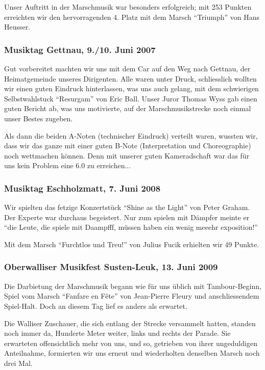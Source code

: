 \begin{history}
    Unser Auftritt in der Marschmusik war besonders erfolgreich; mit 253 Punkten
    erreichten wir den hervorragenden 4. Platz mit dem Marsch \enquote{Triumph}
    von Hans Heusser.


    \subsubsection*{Musiktag Gettnau, 9./10. Juni 2007}

    Gut vorbereitet machten wir uns mit dem Car auf den Weg nach Gettnau, der
    Heimatgemeinde unseres Dirigenten. Alle waren unter Druck, schliesslich
    wollten wir einen guten Eindruck hinterlassen, was uns auch gelang, mit dem
    schwierigen Selbstwahlstuck \enquote{Resurgam} von Eric Ball. Unser Juror
    Thomas Wyss gab einen guten Bericht ab, was uns motivierte, auf der
    Marschmusikstrecke noch einmal unser Bestes zugeben.

    Als dann die beiden A-Noten (technischer Eindruck) verteilt waren, wussten
    wir, dass wir das ganze mit einer guten B-Note (Interpretation und
    Choreographie) noch wettmachen können. Denn mit unserer guten Kameradschaft
    war das für uns kein Problem eine 6.0 zu erreichen...


    \subsubsection*{Musiktag Eschholzmatt, 7. Juni 2008}

    Wir spielten das fetzige Konzertstück \enquote{Shine as the Light} von Peter
    Graham. Der Experte war durchaus begeistert. Nur zum spielen mit Dämpfer
    meinte er \enquote{die Leute, die spiele mit Daampfff, müssen haben ein
        wenig meeehr exposition!}

    Mit dem Marsch \enquote{Furchtlos und Treu!} von Julius Fucik erhielten wir
    49 Punkte.


    \subsubsection*{Oberwalliser Musikfest Susten-Leuk, 13. Juni 2009}

    Die Darbietung der Marschmusik begann wie für uns üblich mit Tambour-Beginn,
    Spiel vom Marsch \enquote{Fanfare en Fête} von Jean-Pierre Fleury und
    anschliessendem Spiel-Halt. Doch an diesem Tag lief es anders als erwartet.

    Die Walliser Zuschauer, die sich entlang der Strecke versammelt hatten,
    standen noch immer da, Hunderte Meter weiter, links und rechts der Parade.
    Sie erwarteten offensichtlich mehr von uns, und so, getrieben von ihrer
    ungeduldigen Anteilnahme, formierten wir uns erneut und wiederholten
    denselben Marsch noch drei Mal.


\end{history}

